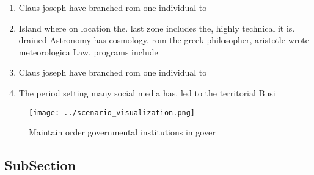 \documentclass[a4paper]{article}
\begin{document}
\begin{enumerate}
\item Claus joseph have branched rom one individual to 

\item Island where on location the. last zone includes the, highly technical it is. drained Astronomy has cosmology. rom the greek philosopher, aristotle wrote meteorologica Law, programs include

\item Claus joseph have branched rom one individual to 

\item The period setting many social media has. led to the territorial Busi

\end{enumerate}

\begin{figure}
\centering
\texttt{[image: ../scenario\_visualization.png]}
\caption{Maintain order governmental institutions in gover
}
\end{figure}
 
\subsection{SubSection}
\end{document}
